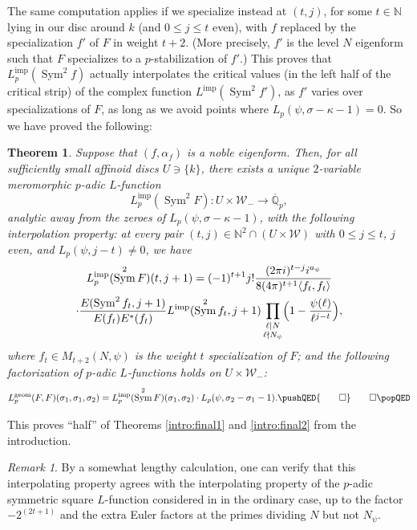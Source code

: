 \documentclass[11pt, a4paper, reqno]{amsart}
\theoremstyle{definition}
\theoremstyle{plain}
\newtheorem{theorem}[definition]{Theorem}
\theoremstyle{remark}
\newtheorem*{remark}{Remark}
\DeclareMathOperator{\Sym}{Sym}
\newcommand{\numberset}{\mathbb}
\newcommand{\Q}{\numberset{Q}}
\newcommand{\N}{\numberset{N}}
\newcommand{\Weight}{\mathcal{W}}
\newcommand{\Lgeom}{L_p^{\mathrm{geom}}}
\newcommand{\Limp}{L^{\mathrm{imp}}}
\renewcommand{\le}{\leqslant}
\newcommand{\myqed}{\pushQED{\qed} \qedhere \popQED}
\begin{document}
  The same computation applies if we specialize instead at $(t, j)$, for some $t \in \N$ lying in our disc around $k$ (and $0 \le j \le t$ even), with $f$ replaced by the specialization $f'$ of $F$ in weight $t + 2$. (More precisely, $f'$ is the level $N$ eigenform such that $F$ specializes to a $p$-stabilization of $f'$.) This proves that $\Limp_p(\Sym^2 f)$ actually interpolates the critical values (in the left half of the critical strip) of the complex function $\Limp(\Sym^2 f')$, as $f'$ varies over specializations of $F$, as long as we avoid points where $L_p(\psi, \sigma - \kappa - 1) = 0$. So we have proved the following:

  \begin{theorem}
   \label{thm:first-half-final}
   Suppose that $(f, \alpha_f)$ is a noble eigenform. Then, for all sufficiently small affinoid discs $U \ni \{k\}$, there exists a unique $2$-variable meromorphic $p$-adic $L$-function
   \[ \Limp_p(\Sym^2 F)\colon U\times\Weight_- \to \overline{\Q}_p, \]
   analytic away from the zeroes of $L_p(\psi, \sigma - \kappa - 1)$, with the following interpolation property: at every pair $(t,j)\in \N^2 \cap\left( U\times \Weight\right)$ with $0 \le j \le t$, $j$ even, and $L_p(\psi, j - t) \ne 0$, we have
   \begin{multline}
    \label{eq:final-interpolation}
    \Limp_p(\Sym^2 F)(t,j+1) = (-1)^{t+1}j! \frac{(2\pi i)^{t-j} i^{a_{\psi}}}{8(4\pi)^{t+1}\langle f_{t},f_{t} \rangle} \\
    \cdot \frac{E(\Sym^2 f_{t},j+1)}{E(f_{t})E^*(f_{t})} \Limp(\Sym^2 f_{t},j+1)\prod_{\substack{\ell \mid N \\ \ell \nmid N_{\psi}}} \Bigl(1 - \frac{\psi(\ell)}{\ell^{j-t}}\Bigr),
   \end{multline}
   where $f_{t}\in M_{t+2}(N,\psi)$ is the weight $t$ specialization of $F$; and the following factorization of $p$-adic $L$-functions holds on $U \times \Weight_-$:
   \begin{equation}
    \label{eq:final-factorization}
    \Lgeom(F,F)(\sigma_1,\sigma_1,\sigma_2) = \Limp_p(\Sym^2 F)(\sigma_1,\sigma_2)\cdot L_p(\psi,\sigma_2-\sigma_1-1).\myqed
   \end{equation}
  \end{theorem}
  
  This proves ``half'' of Theorems \ref{intro:final1} and \ref{intro:final2} from the introduction.
  
  \begin{remark}
   By a somewhat lengthy calculation, one can verify that this interpolating property agrees with the interpolating property of the $p$-adic symmetric square $L$-function considered in \cite{Dasgupta-factorization} in the ordinary case, up to the factor $-2^{(2t + 1)}$ and the extra Euler factors at the primes dividing $N$ but not $N_\psi$.
  \end{remark}
\end{document}

